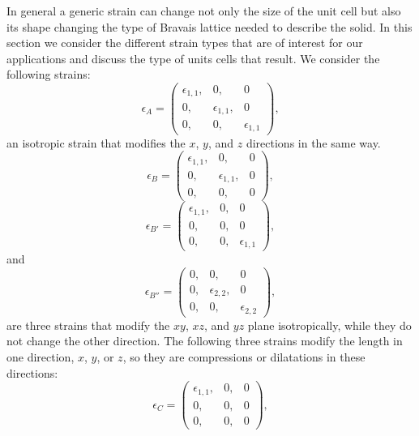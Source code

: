 \documentclass[12pt,a4paper]{article}
\begin{document}
In general a generic strain can change not only the size of the
unit cell but also its shape changing the type of Bravais lattice 
needed to describe the solid. In this section we consider the different 
strain types that are of interest for our applications and
discuss the type of units cells that result. 
We consider the following strains:
\begin{equation}
\epsilon_A=\left( \begin{array}{ccc}
\epsilon_{1,1}, & 0, & 0 
\\
0,& \epsilon_{1,1}, & 0 
\\
0,& 0, & \epsilon_{1,1}
\end{array}
\right),
\end{equation}
an isotropic strain that modifies the $x$, $y$, and $z$ directions in the
same way.
\begin{equation}
\epsilon_B=\left( \begin{array}{ccc}
\epsilon_{1,1},& 0, & 0 
\\
0, & \epsilon_{1,1}, &  0 
\\
0, & 0, &  0
\end{array}
\right),
\end{equation}
\begin{equation}
\epsilon_{B'}=\left( \begin{array}{ccc}
\epsilon_{1,1},& 0, & 0 
\\
0, & 0, &  0
\\
0, & 0, & \epsilon_{1,1}
\end{array}
\right),
\end{equation}
and
\begin{equation}
\epsilon_{B''}=\left( \begin{array}{ccc}
0, & 0, & 0 
\\
0, & \epsilon_{2,2}, &  0
\\
0, & 0, & \epsilon_{2,2}
\end{array}
\right),
\end{equation}
are three strains that modify the $xy$, $xz$, and $yz$ plane 
isotropically, while they do not change the other direction.
The following three strains modify the length in one direction, 
$x$, $y$, or $z$, so they are compressions or dilatations in these directions:
\begin{equation}
\epsilon_C=\left( \begin{array}{ccc}
\epsilon_{1,1}, & 0, & 0 
\\
0, & 0, & 0 
\\
0, & 0, & 0
\end{array}
\right),
\end{equation}
\end{document}
